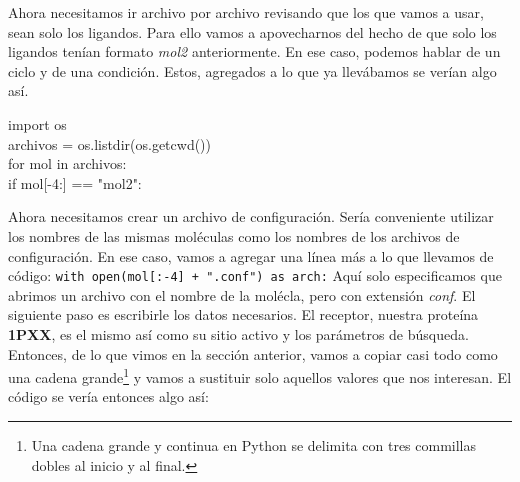 \documentclass[10pt,letterpaper]{article}
\newcommand{\inlinecode}[1]{
\colorbox{light-gray}{\texttt{#1}}
}
\newenvironment{Code}
{
\begin{lrbox}{\selvestebox}%
\begin{minipage}{\dimexpr\columnwidth-2\fboxsep\relax}
\fontfamily{\ttdefault}\selectfont
}
{\end{minipage}\end{lrbox}%
\begin{center}
\colorbox{light-gray}{\usebox{\selvestebox}}
\end{center}
}
\begin{document}
Ahora necesitamos ir archivo por archivo revisando que los que vamos a usar, sean solo los ligandos. Para ello vamos a apovecharnos del hecho de que solo los ligandos ten\'ian formato \emph{mol2} anteriormente. En ese caso, podemos hablar de un ciclo y de una condici\'on. Estos, agregados a lo que ya llev\'abamos se ver\'ian algo as\'i.

\begin{Code}
import os\\
archivos = os.listdir(os.getcwd())\\
for mol in archivos:\\
\hspace*{6mm}if mol[-4:] == "mol2":
\end{Code}

Ahora necesitamos crear un archivo de configuraci\'on. Ser\'ia conveniente utilizar los nombres de las mismas mol\'eculas como los nombres de los archivos de configuraci\'on. En ese caso, vamos a agregar una l\'inea m\'as a lo que llevamos de c\'odigo: \inlinecode{with open(mol[:-4] + ".conf") as arch:} Aqu\'i solo especificamos que abrimos un archivo con el nombre de la mol\'ecla, pero con extensi\'on \emph{conf}. El siguiente paso es escribirle los datos necesarios. El receptor, nuestra prote\'ina \textbf{1PXX}, es el mismo as\'i como su sitio activo y los par\'ametros de b\'usqueda. Entonces, de lo que vimos en la secci\'on anterior, vamos a copiar casi todo como una cadena grande\footnote{Una cadena grande y continua en Python se delimita con tres commillas dobles al inicio y al final.} y vamos a sustituir solo aquellos valores que nos interesan. El c\'odigo se ver\'ia entonces algo as\'i:
\end{document}
